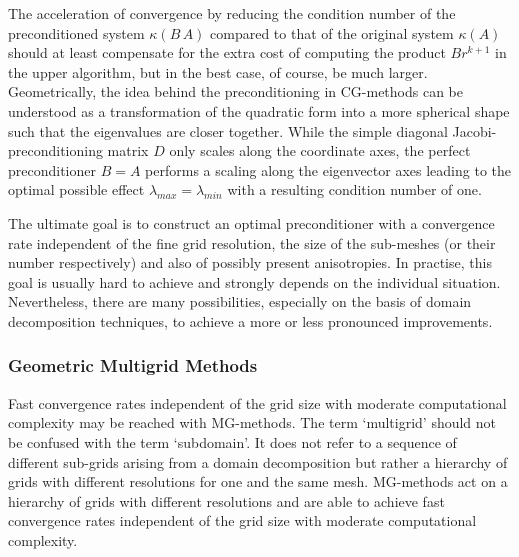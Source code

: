 The acceleration of convergence by reducing the condition number of the preconditioned system $\kappa(B \, A)$ compared to that of the original system $\kappa(A)$ should at least compensate for the extra cost of computing the product $B r^{k+1}$ in the upper algorithm, 
but in the best case, of course, be much larger. 
%
Geometrically, the idea behind the preconditioning in CG-methods can be understood as a transformation of the quadratic form into a more spherical shape such that the eigenvalues are closer together. While the simple diagonal Jacobi-preconditioning matrix $D$ only scales along the coordinate axes, the perfect preconditioner $B=A$ performs a scaling along the eigenvector axes leading to the optimal possible effect $\lambda_{max}=\lambda_{min}$ with a resulting condition number of one.



The ultimate goal is to construct an optimal
preconditioner with a convergence rate independent of the fine grid resolution, the size of the sub-meshes (or their number respectively) and also of possibly present anisotropies. In practise, this goal is usually hard to achieve and strongly depends on the individual situation. Nevertheless, there are many possibilities, especially on the basis of  domain decomposition techniques, to achieve a more or less pronounced improvements.%

\subsubsection{Geometric Multigrid Methods}
\label{SEC_SCARC_mg}

Fast convergence rates independent of the grid size with moderate computational complexity may be reached with MG-methods. The term `multigrid' should not be confused with the term `subdomain'. It does not refer to a sequence of different sub-grids arising from a domain decomposition but rather a hierarchy of grids with different resolutions for one and the same mesh.
MG-methods act on a hierarchy of grids with different resolutions and are able to achieve fast convergence rates independent of the grid size with moderate computational complexity.

